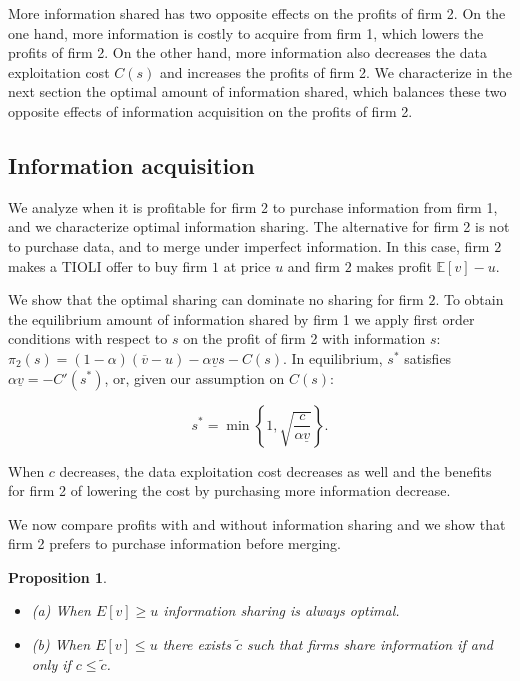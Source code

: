 \documentclass[a4paper,leqno]{article}%
\newtheorem{prop}{Proposition}
\newcommand{\E}{\mathbb E}
\renewcommand{\a}{\alpha}
\newcommand{\uv}{\underline{v}}
\newcommand{\ov}{\overline{v}}
\begin{document}
\noindent More information shared has two opposite effects on the profits of firm 2. On the one hand, more information is costly to acquire from firm 1, which lowers the profits of firm 2. On the other hand, more information also decreases the data exploitation cost $C(s)$ and increases the profits of firm 2. We characterize in the next section the optimal amount of information shared, which balances these two opposite effects of information acquisition on the profits of firm 2.


\medskip

\subsection{Information acquisition}\label{infacq}

We analyze when it is profitable for firm 2 to purchase information from firm 1, and we characterize optimal information sharing. The alternative for firm 2 is not to purchase data, and to merge under imperfect information. In this case, firm $2$ makes a TIOLI offer to buy firm $1$ at price $u$ and firm $2$ makes profit $\E[v]-u$. 


We show that the optimal sharing can dominate no sharing for firm $2$. To obtain the equilibrium amount of information shared by firm 1 we apply first order conditions with respect to $s$ on the profit of firm 2 with information $s$: $\pi_2(s)=(1-\a)(\ov -u)-\a \uv s-C(s)$. In equilibrium, $s^*$ satisfies $\a \uv =-C'(s^*)$, or, given our assumption on $C(s)$:

\begin{equation}
    s^*=\min\left\{1,\sqrt{\frac{c}{\a \uv}}\right\}.
\end{equation}


\noindent When $c$ decreases, the data exploitation cost decreases as well and the benefits for firm 2 of lowering the cost by purchasing more information decrease.

\medskip

We now compare profits with and without information sharing and we show that firm 2 prefers to purchase information before merging.

\begin{prop}~~\label{prop:1}

\begin{itemize}
    \item (a) When $E[v]\geq u$ information sharing is always optimal.
    \item (b) When $E[v]\leq u$ there exists $\tilde{c}$ such that firms share information if and only if $c\leq \tilde{c}$.
\end{itemize} 

\end{prop}
\end{document}
